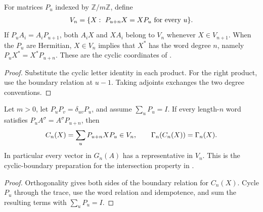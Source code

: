 \begin{definition}
    \label{def:cyclic_boundary_degree}
    \leanok
    For matrices $P_u$ indexed by $\mathbb Z/m\mathbb Z$, define
    \begin{align}
        V_n=\{X:\ P_{u+n}X=XP_u\text{ for every }u\}.
        \notag
    \end{align}
    If $P_uA_i=A_iP_{u+1}$, both $A_iX$ and $XA_i$ belong
    to $V_n$ whenever $X\in V_{n+1}$.
    When the $P_u$ are Hermitian, $X\in V_n$ implies that
    $X^*$ has the word degree $n$, namely $P_uX^*=X^*P_{u+n}$.
    These are the cyclic coordinates of
    \cite[Lemma~5]{DeLasCuevas2017Irreducible}.
\end{definition}
\begin{proof}\leanok
    Substitute the cyclic letter identity in each product. For the right
    product, use the boundary relation at $u-1$. Taking adjoints
    exchanges the two degree conventions.
\end{proof}

\begin{lemma}
    \label{thm:cyclic_boundary_compression}
    \leanok
    Let $m>0$, let $P_uP_v=\delta_{uv}P_u$, and assume
    $\sum_uP_u=I$. If every length-$n$ word satisfies
    $P_uA^\sigma=A^\sigma P_{u+n}$, then
    \begin{align}
        C_n(X)=\sum_uP_{u+n}XP_u\in V_n,
        \qquad \Gamma_n(C_n(X))=\Gamma_n(X).
        \notag
    \end{align}
    In particular every vector in $G_n(A)$ has a representative in $V_n$.
    This is the cyclic-boundary preparation for the intersection
    property in \cite[equations (3.10)--(3.11)]{Nachtergaele1996Spectral}.
\end{lemma}
\begin{proof}\leanok
    Orthogonality gives both sides of the boundary relation for $C_n(X)$.
    Cycle $P_u$ through the trace, use the word relation and idempotence,
    and sum the resulting terms with $\sum_uP_u=I$.
\end{proof}


